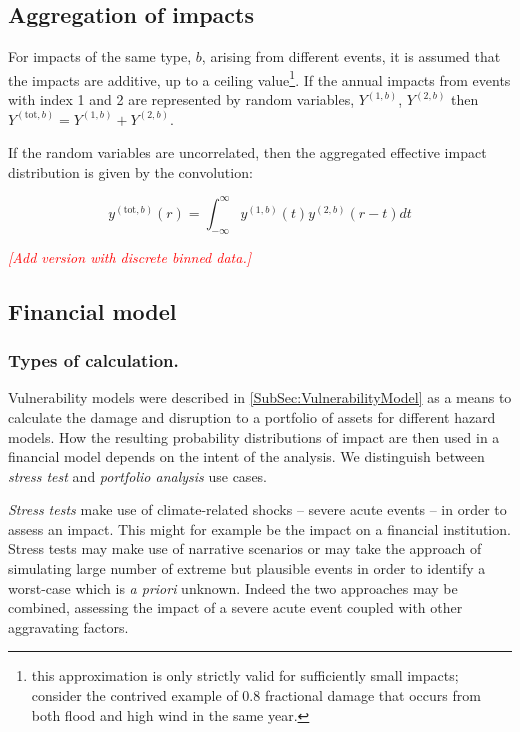 \documentclass[a4paper,11pt]{extarticle} %
\theoremstyle{definition}
\begin{document}
\subsection{Aggregation of impacts}
For impacts of the same type, $b$, arising from different events, it is assumed that the impacts are additive, up to a ceiling value\footnote{this approximation is only strictly valid for sufficiently small impacts; consider the contrived example of 0.8 fractional damage that occurs from both flood and high wind in the same year.}. If the annual impacts from events with index 1 and 2 are represented by random variables, $Y^{(1,b)}$, $Y^{(2,b)}$ then $Y^{(\text{tot}, b)} = Y^{(1,b)} + Y^{(2,b)}$.

If the random variables are uncorrelated, then the aggregated effective impact distribution is given by the convolution:

\begin{equation}
    \label{Eq:sampling}
    y^{(\text{tot}, b)}(r) = \int^{\infty}_{-\infty} y^{(1, b)}(t) y^{(2, b)}(r - t) dt
\end{equation}

{\textcolor{red}{\emph{[Add version with discrete binned data.]}}}

\subsection{Financial model}

\subsubsection{Types of calculation.}
Vulnerability models were described in \ref{SubSec:VulnerabilityModel} as a means to calculate the damage and disruption to a portfolio of assets for different hazard models. How the resulting probability distributions of impact are then used in a financial model depends on the intent of the analysis. We distinguish between \emph{stress test} and \emph{portfolio analysis} use cases.

\emph{Stress tests} make use of climate-related shocks -- severe acute events -- in order to assess an impact. This might for example be the impact on a financial institution. Stress tests may make use of narrative scenarios or may take the approach of simulating large number of extreme but plausible events in order to identify a worst-case which is \emph{a priori} unknown. Indeed the two approaches may be combined, assessing the impact of a severe acute event coupled with other aggravating factors.
\end{document}
